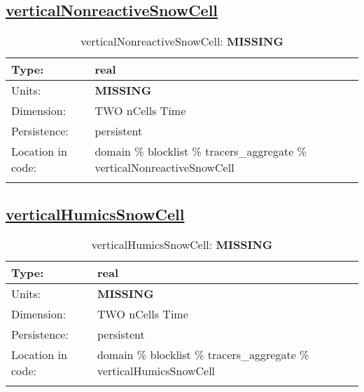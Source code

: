 \subsection[verticalNonreactiveSnowCell]{\hyperref[sec:var_tab_tracers_aggregate]{verticalNonreactiveSnowCell}}
\label{subsec:var_sec_tracers_aggregate_verticalNonreactiveSnowCell}
\begin{center}
\begin{longtable}{| p{2.0in} | p{4.0in} |}
        \hline 
        Type: & real \\
        \hline 
        Units: & {\bf \color{red} MISSING} \\
        \hline 
        Dimension: & TWO nCells Time \\
        \hline 
        Persistence: & persistent \\
        \hline 
         Location in code: & domain \% blocklist \% tracers\_aggregate \% verticalNonreactiveSnowCell \\
         \hline 
    \caption{verticalNonreactiveSnowCell: {\bf \color{red} MISSING}}
\end{longtable}
\end{center}
\subsection[verticalHumicsSnowCell]{\hyperref[sec:var_tab_tracers_aggregate]{verticalHumicsSnowCell}}
\label{subsec:var_sec_tracers_aggregate_verticalHumicsSnowCell}
\begin{center}
\begin{longtable}{| p{2.0in} | p{4.0in} |}
        \hline 
        Type: & real \\
        \hline 
        Units: & {\bf \color{red} MISSING} \\
        \hline 
        Dimension: & TWO nCells Time \\
        \hline 
        Persistence: & persistent \\
        \hline 
         Location in code: & domain \% blocklist \% tracers\_aggregate \% verticalHumicsSnowCell \\
         \hline 
    \caption{verticalHumicsSnowCell: {\bf \color{red} MISSING}}
\end{longtable}
\end{center}
